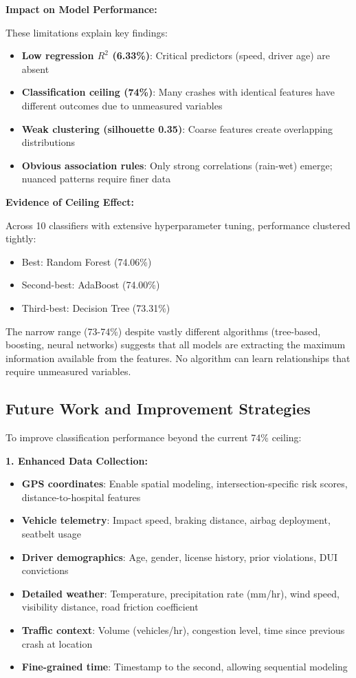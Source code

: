 \documentclass[12pt,man]{apa7}
\begin{document}
\textbf{Impact on Model Performance:}

These limitations explain key findings:
\begin{itemize}
    \item \textbf{Low regression $R^2$ (6.33\%)}: Critical predictors (speed, driver age) are absent
    \item \textbf{Classification ceiling (74\%)}: Many crashes with identical features have different outcomes due to unmeasured variables
    \item \textbf{Weak clustering (silhouette 0.35)}: Coarse features create overlapping distributions
    \item \textbf{Obvious association rules}: Only strong correlations (rain-wet) emerge; nuanced patterns require finer data
\end{itemize}

\textbf{Evidence of Ceiling Effect:}

Across 10 classifiers with extensive hyperparameter tuning, performance clustered tightly:
\begin{itemize}
    \item Best: Random Forest (74.06\%)
    \item Second-best: AdaBoost (74.00\%)
    \item Third-best: Decision Tree (73.31\%)
\end{itemize}

The narrow range (73-74\%) despite vastly different algorithms (tree-based, boosting, neural networks) suggests that all models are extracting the maximum information available from the features. No algorithm can learn relationships that require unmeasured variables.

\subsection{Future Work and Improvement Strategies}

To improve classification performance beyond the current 74\% ceiling:

\textbf{1. Enhanced Data Collection:}
\begin{itemize}
    \item \textbf{GPS coordinates}: Enable spatial modeling, intersection-specific risk scores, distance-to-hospital features
    \item \textbf{Vehicle telemetry}: Impact speed, braking distance, airbag deployment, seatbelt usage
    \item \textbf{Driver demographics}: Age, gender, license history, prior violations, DUI convictions
    \item \textbf{Detailed weather}: Temperature, precipitation rate (mm/hr), wind speed, visibility distance, road friction coefficient
    \item \textbf{Traffic context}: Volume (vehicles/hr), congestion level, time since previous crash at location
    \item \textbf{Fine-grained time}: Timestamp to the second, allowing sequential modeling
\end{itemize}
\end{document}
